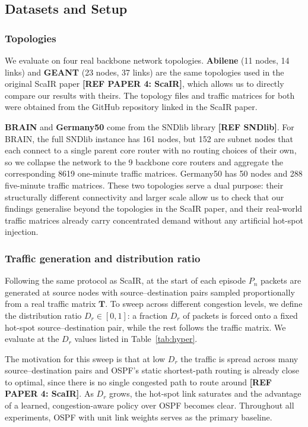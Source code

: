 \documentclass[10pt,twocolumn,letterpaper]{article}
\begin{document}
\subsection{Datasets and Setup}

\subsubsection{Topologies}

We evaluate on four real backbone network topologies. \textbf{Abilene} (11 nodes, 14 links) and \textbf{GEANT} (23 nodes, 37 links) are the same topologies used in the original ScaIR paper \textbf{[REF PAPER 4: ScaIR]}, which allows us to directly compare our results with theirs. The topology files and traffic matrices for both were obtained from the GitHub repository linked in the ScaIR paper.

\textbf{BRAIN} and \textbf{Germany50} come from the SNDlib library \textbf{[REF SNDlib]}. For BRAIN, the full SNDlib instance has 161 nodes, but 152 are subnet nodes that each connect to a single parent core router with no routing choices of their own, so we collapse the network to the 9 backbone core routers and aggregate the corresponding 8619 one-minute traffic matrices. Germany50 has 50 nodes and 288 five-minute traffic matrices. These two topologies serve a dual purpose: their structurally different connectivity and larger scale allow us to check that our findings generalise beyond the topologies in the ScaIR paper, and their real-world traffic matrices already carry concentrated demand without any artificial hot-spot injection.

\subsubsection{Traffic generation and distribution ratio}

Following the same protocol as ScaIR, at the start of each episode $P_n$ packets are generated at source nodes with source--destination pairs sampled proportionally from a real traffic matrix $\mathbf{T}$. To sweep across different congestion levels, we define the distribution ratio $D_r \in [0, 1]$: a fraction $D_r$ of packets is forced onto a fixed hot-spot source--destination pair, while the rest follows the traffic matrix. We evaluate at the $D_r$ values listed in Table~\ref{tab:hyper}.

The motivation for this sweep is that at low $D_r$ the traffic is spread across many source--destination pairs and OSPF's static shortest-path routing is already close to optimal, since there is no single congested path to route around \textbf{[REF PAPER 4: ScaIR]}. As $D_r$ grows, the hot-spot link saturates and the advantage of a learned, congestion-aware policy over OSPF becomes clear. Throughout all experiments, OSPF with unit link weights serves as the primary baseline.
\end{document}

